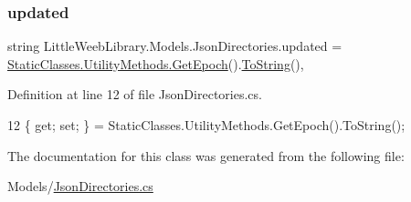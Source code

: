 \subsubsection{\texorpdfstring{updated}{updated}}
{\footnotesize\ttfamily string Little\+Weeb\+Library.\+Models.\+Json\+Directories.\+updated = \mbox{\hyperlink{class_little_weeb_library_1_1_static_classes_1_1_utility_methods_a12336d9e64983ddabaad8950486fafb2}{Static\+Classes.\+Utility\+Methods.\+Get\+Epoch}}().\mbox{\hyperlink{class_little_weeb_library_1_1_models_1_1_json_directories_aef343d105a3881b4c144dc557aaf76dc}{To\+String}}()\hspace{0.3cm}{\ttfamily [get]}, {\ttfamily [set]}}



Definition at line 12 of file Json\+Directories.\+cs.


\begin{DoxyCode}
12 \{ \textcolor{keyword}{get}; \textcolor{keyword}{set}; \} = StaticClasses.UtilityMethods.GetEpoch().ToString();
\end{DoxyCode}


The documentation for this class was generated from the following file\+:\begin{DoxyCompactItemize}
\item 
Models/\mbox{\hyperlink{_json_directories_8cs}{Json\+Directories.\+cs}}\end{DoxyCompactItemize}
